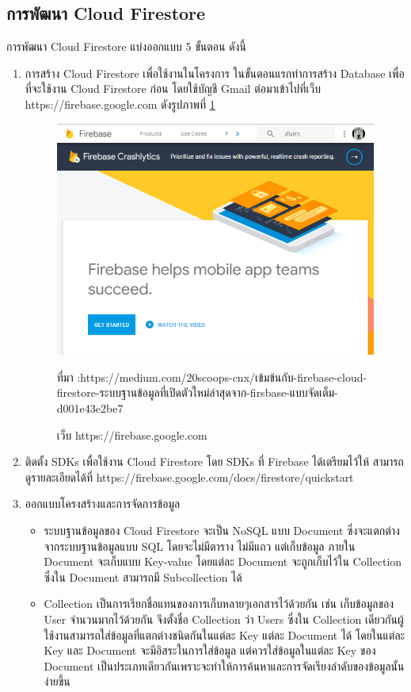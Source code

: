 \subsection{การพัฒนา Cloud Firestore}
การพัฒนา Cloud Firestore แบ่งออกแบบ 5 ขั้นตอน ดังนี้
\begin{enumerate}
	\item การสร้าง Cloud Firestore เพื่อใช้งานในโครงการ ในขั้นตอนแรกทำการสร้าง Database เพื่อที่จะใช้งาน Cloud Firestore ก่อน โดยใช้บัญชี Gmail ต่อมาเข้าไปที่เว็บ https://firebase.google.com  ดังรูปภาพที่ \ref{Fig:f1}
	\begin{figure}[H]
		\centering
		\includegraphics[width=0.7\columnwidth]{Figures/2/f1}
		\caption{เว็บ https://firebase.google.com}{ที่มา :https://medium.com/20scoops-cnx/เข้มข้นกับ-firebase-cloud-firestore-ระบบฐานข้อมูลที่เปิดตัวใหม่ล่าสุดจาก-firsbase-แบบจัดเต็ม-d001e43e2be7 }
		\label{Fig:f1}
	\end{figure}
	\item ติดตั้ง SDKs เพื่อใช้งาน Cloud Firestore
	โดย SDKs ที่ Firebase ได้เตรียมไว้ให้ สามารถดูรายละเอียดได้ที่ https://firebase.google.com/docs/firestore/quickstart
	\item ออกแบบโครงสร้างและการจัดการข้อมูล  
	\begin{itemize}
		\item  ระบบฐานข้อมูลของ Cloud Firestore จะเป็น NoSQL แบบ Document ซึ่งจะแตกต่างจากระบบฐานข้อมูลแบบ SQL โดยจะไม่มีตาราง ไม่มีแถว แต่เก็บข้อมูล ภายใน Document จะเก็บแบบ Key-value โดยแต่ละ Document จะถูกเก็บไว้ใน Collection ซึ่งใน Document สามารถมี Subcollection ได้
		\item Collection เป็นการเรียกชื่อแทนของการเก็บหลายๆเอกสารไว้ด้วยกัน เช่น เก็บข้อมูลของ User จำนวนมากไว้ด้วยกัน จึงตั้งชื่อ Collection ว่า Users ซึ่งใน Collection เดียวกันผู้ใช้งานสามารถใส่ข้อมูลที่แตกต่างชนิดกันในแต่ละ Key แต่ละ Document ได้ โดยในแต่ละ Key และ Document จะมีอิสระในการใส่ข้อมูล แต่ควรใส่ข้อมูลในแต่ละ Key ของ Document เป็นประเภทเดียวกันเพราะจะทำให้การค้นหาและการจัดเรียงลำดับของข้อมูลนั้นง่ายขึ้น

\end{itemize}
\end{enumerate}
